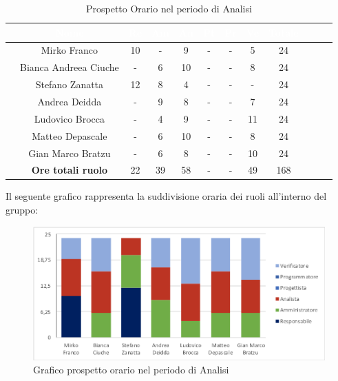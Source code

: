\begin{table}[ht]
	\begin{center}
		\begin{tabular}{cccccccccccc}
			\rowcolor{coolblack}
			\hline 
			& \textcolor{white}{Nome} & \textcolor{white}{Re} & \textcolor{white}{Am} & \textcolor{white}{An} & \textcolor{white}{Pt} &\textcolor{white}{Pr} & \textcolor{white}{Ve} & \textcolor{white}{Totale} \\
			\hline
			
			&Mirko Franco          & 10 & - & 9 & - & - & 5 &24  \\
			&Bianca Andreea Ciuche        & -  & 6 & 10 & - & - & 8 & 24 \\
			&Stefano Zanatta     & 12& 8 & 4 & - & - & - & 24 \\
			&Andrea Deidda       &  -& 9 & 8 & - & - & 7 & 24 \\
			&Ludovico Brocca    & -& 4 & 9 & - & - & 11 & 24 \\
			&Matteo Depascale  & -& 6& 10 & - & - & 8 & 24 \\
			&Gian Marco Bratzu & -& 6 & 8 & - & - & 10 & 24 \\
			\hline
			&\textbf{Ore totali ruolo} & 22 & 39 & 58 & - & - & 49 & 168 \\
		\end{tabular}
		\caption{Prospetto Orario nel periodo di Analisi}
	\end{center}
\end{table}

Il seguente grafico rappresenta la suddivisione oraria dei ruoli all'interno del gruppo:
\begin{figure}[!ht]
	\begin{center}
		\includegraphics[scale=0.90]{images/grafoProspettoOrario.png}
		\caption{Grafico prospetto orario nel periodo di Analisi}
	\end{center}
\end{figure}

